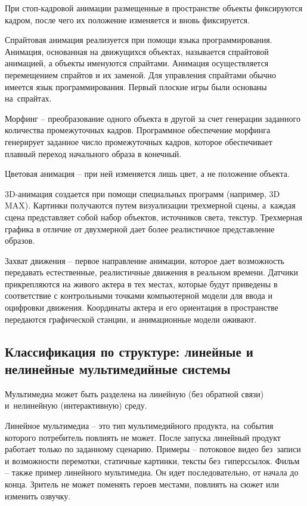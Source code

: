\documentclass{ou}
\begin{document}
При стоп-кадровой анимации размещенные в пространстве объекты фиксируются кадром, после чего их положение изменяется и вновь фиксируется.

Спрайтовая анимация реализуется при помощи языка программирования. Анимация, основанная на движущихся объектах, называется спрайтовой анимацией, а объекты именуются спрайтами. Анимация осуществляется перемещением спрайтов и их заменой. Для управления спрайтами обычно имеется язык программирования. Первый плоские игры были основаны на~спрайтах.

Морфинг -- преобразование одного объекта в другой за счет генерации заданного количества промежуточных кадров. Программное обеспечение морфинга генерирует заданное число промежуточных кадров, которое обеспечивает плавный переход начального образа в конечный.

Цветовая анимация -- при ней изменяется лишь цвет, а не положение объекта.

3D-анимация создается при помощи специальных программ (например, 3D MAX). Картинки получаются путем визуализации трехмерной сцены, а~каждая сцена представляет собой набор объектов, источников света, текстур. Трехмерная графика в отличие от двухмерной дает более реалистичное представление образов.

Захват движения -- первое направление анимации, которое дает возможность передавать естественные, реалистичные движения в реальном времени. Датчики прикрепляются на живого актера в тех местах, которые будут приведены в соответствие с контрольными точками компьютерной модели для ввода и оцифровки движения. Координаты актера и его ориентация в пространстве передаются графической станции, и анимационные модели оживают\cite{Katsko_2015}.
\subsection{Классификация по структуре: линейные и нелинейные мультимедийные системы}
Мультимедиа может быть разделена на линейную (без обратной связи) и~нелинейную (интерактивную) среду.

Линейное мультимедиа -- это тип мультимедийного продукта, на~события которого потребитель повлиять не может. После запуска линейный продукт работает только по заданному сценарию. Примеры -- потоковое видео без~записи и возможности перемотки, статичные картинки, тексты без~гиперссылок. Фильм -- также пример линейного мультимедиа. Он идет последовательно, от начала до конца. Зритель не может поменять героев местами, повлиять на сюжет или изменить озвучку.
\end{document}
